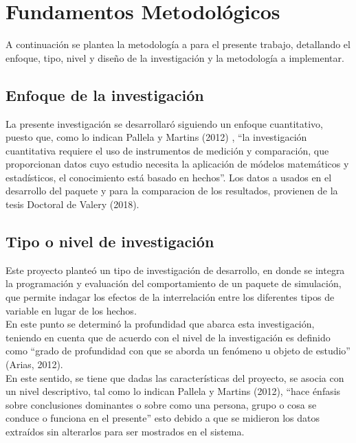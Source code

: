 \chapter{Fundamentos Metodol\'ogicos}

	A continuaci\'on se plantea la metodolog\'ia a para el presente trabajo, detallando el enfoque, tipo, nivel y dise\~no de la investigaci\'on y la metodolog\'ia a implementar.
	
\section{Enfoque de la investigaci\'on}
	
	La presente investigaci\'on se desarrollar\'o siguiendo un enfoque cuantitativo, puesto que, como lo indican Pallela y  Martins (2012) , “la investigaci\'on cuantitativa requiere el uso de instrumentos de medici\'on y comparaci\'on, que proporcionan datos cuyo estudio necesita la aplicaci\'on de m\'odelos matem\'aticos y estad\'isticos, el conocimiento est\'a basado en hechos”.  Los datos a usados en el desarrollo del paquete y para la comparacion de los resultados, provienen de la tesis Doctoral de Valery (2018).\\
	
\section{Tipo o nivel de investigaci\'on}
	
	Este proyecto plante\'o un tipo de investigaci\'on de desarrollo, en donde se integra la programaci\'on y evaluaci\'on del comportamiento de un paquete de simulación, que permite indagar los efectos de la interrelaci\'on entre los diferentes tipos de variable en lugar de los hechos.\\

	En este punto se determinó la profundidad que abarca esta investigaci\'on, teniendo en cuenta que de acuerdo con  el nivel de la investigaci\'on es definido como “grado de profundidad con que se aborda un fen\'omeno u objeto de estudio” (Arias, 2012).\\

	En este sentido, se tiene que dadas las caracter\'isticas del proyecto, se asocia con un nivel descriptivo, tal como lo indican Pallela y  Martins (2012),  “hace \'enfasis sobre conclusiones dominantes o sobre como una persona, grupo o cosa se conduce o funciona en el presente” esto debido a que se midieron los datos extra\'idos sin alterarlos para ser mostrados en el sistema.\\


